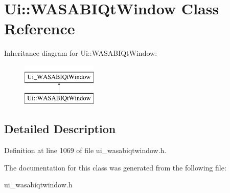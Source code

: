 \hypertarget{class_ui_1_1_w_a_s_a_b_i_qt_window}{
\section{\-Ui\-:\-:\-W\-A\-S\-A\-B\-I\-Qt\-Window \-Class \-Reference}
\label{class_ui_1_1_w_a_s_a_b_i_qt_window}
}
\-Inheritance diagram for \-Ui\-:\-:\-W\-A\-S\-A\-B\-I\-Qt\-Window\-:\begin{figure}[H]
\begin{center}
\leavevmode
\includegraphics[height=2.000000cm]{class_ui_1_1_w_a_s_a_b_i_qt_window}
\end{center}
\end{figure}


\subsection{\-Detailed \-Description}


\-Definition at line 1069 of file ui\-\_\-wasabiqtwindow.\-h.



\-The documentation for this class was generated from the following file\-:\begin{DoxyCompactItemize}
\item 
ui\-\_\-wasabiqtwindow.\-h\end{DoxyCompactItemize}
